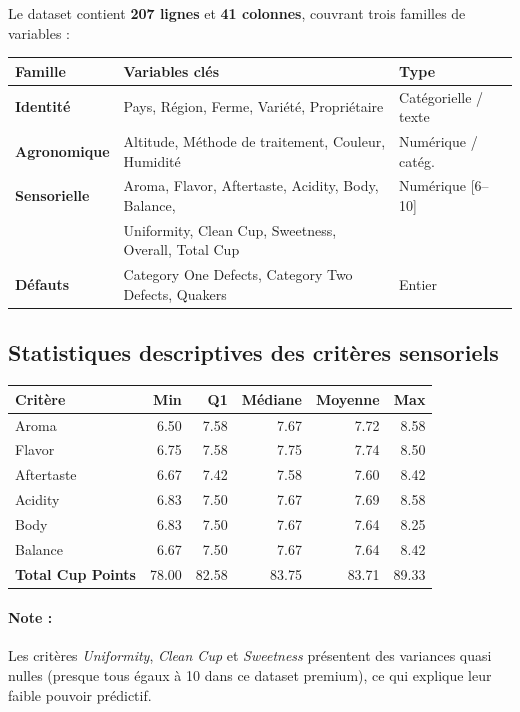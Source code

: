 \documentclass[12pt,a4paper]{article}
\begin{document}
Le dataset contient \textbf{207 lignes} et \textbf{41 colonnes}, couvrant trois familles de variables :

\begin{center}
\begin{tabular}{@{}lll@{}}
\toprule
\rowcolor{coffeecream}
\textbf{Famille} & \textbf{Variables clés} & \textbf{Type} \\
\midrule
\textbf{Identité} & Pays, Région, Ferme, Variété, Propriétaire & Catégorielle / texte \\
\textbf{Agronomique} & Altitude, Méthode de traitement, Couleur, Humidité & Numérique / catég. \\
\textbf{Sensorielle} & Aroma, Flavor, Aftertaste, Acidity, Body, Balance, & Numérique [6--10] \\
& Uniformity, Clean Cup, Sweetness, Overall, Total Cup & \\
\textbf{Défauts} & Category One Defects, Category Two Defects, Quakers & Entier \\
\bottomrule
\end{tabular}
\end{center}

\subsection{Statistiques descriptives des critères sensoriels}

\begin{center}
\begin{tabular}{@{}lrrrrr@{}}
\toprule
\rowcolor{coffeecream}
\textbf{Critère} & \textbf{Min} & \textbf{Q1} & \textbf{Médiane} & \textbf{Moyenne} & \textbf{Max} \\
\midrule
Aroma        & 6.50 & 7.58 & 7.67 & 7.72 & 8.58 \\
Flavor       & 6.75 & 7.58 & 7.75 & 7.74 & 8.50 \\
Aftertaste   & 6.67 & 7.42 & 7.58 & 7.60 & 8.42 \\
Acidity      & 6.83 & 7.50 & 7.67 & 7.69 & 8.58 \\
Body         & 6.83 & 7.50 & 7.67 & 7.64 & 8.25 \\
Balance      & 6.67 & 7.50 & 7.67 & 7.64 & 8.42 \\
\midrule
\textbf{Total Cup Points} & 78.00 & 82.58 & 83.75 & 83.71 & 89.33 \\
\bottomrule
\end{tabular}
\end{center}

\paragraph{Note :} Les critères \textit{Uniformity}, \textit{Clean Cup} et \textit{Sweetness}
présentent des variances quasi nulles (presque tous égaux à 10 dans ce dataset premium), ce qui
explique leur faible pouvoir prédictif.
\end{document}
